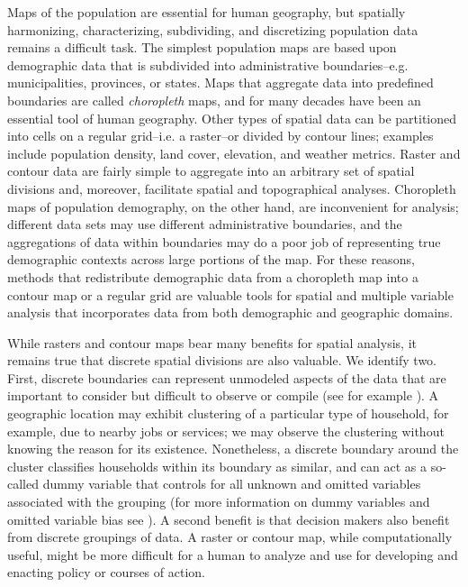 \documentclass[draft]{article}
\begin{document}
Maps of the population are essential for human geography, but spatially harmonizing, characterizing, subdividing, and discretizing population data remains a difficult task.  The simplest population maps are based upon demographic data that is subdivided into administrative boundaries--e.g. municipalities, provinces, or states.  Maps that aggregate data into predefined boundaries are called {\em choropleth} maps, and for many decades have been an essential tool of human geography.  Other types of spatial data can be partitioned into cells on a regular grid--i.e. a raster--or divided by contour lines; examples include population density, land cover, elevation, and weather metrics.  Raster and contour data are fairly simple to aggregate into an arbitrary set of spatial divisions \cite{tobler79} and, moreover, facilitate spatial and topographical analyses.  %
Choropleth maps of population demography, on the other hand, are inconvenient for analysis; different data sets %
may use different administrative boundaries, and the aggregations of data within boundaries may do a poor job of representing true demographic contexts across large portions of the map.  
For these reasons, methods that redistribute demographic data from a choropleth map into a contour map or a regular grid are valuable tools for spatial and multiple variable analysis that incorporates data from both demographic and geographic domains.

While rasters and contour maps bear many benefits for spatial analysis, it remains true that discrete spatial divisions are also valuable.  We identify two.  First, discrete boundaries can represent unmodeled aspects of the data that are important to consider but difficult to observe or compile (see for example \cite{birkin12}).  A geographic location may exhibit clustering of a particular type of household, for example, due to nearby jobs or services; we may observe the clustering without knowing the reason for its existence.  Nonetheless, a discrete boundary around the cluster classifies households within its boundary as similar, and can act as a so-called dummy variable that controls for all unknown and omitted variables associated with the grouping (for more information on dummy variables and omitted variable bias see \cite{wooldridge10}).  A second benefit is that decision makers also benefit from discrete groupings of data.  A raster or contour map, while computationally useful, might be more difficult for a human to analyze and use for developing and enacting policy or courses of action.
\end{document}
